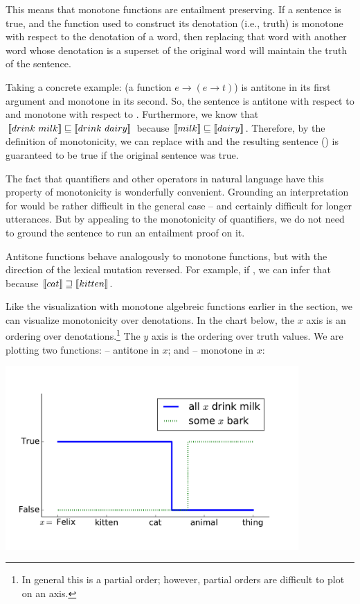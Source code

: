 This means that monotone functions are entailment preserving.
If a sentence is true, and the function used to construct its denotation (i.e., truth)
  is monotone with respect to the denotation of a word, then replacing that word with
  another word whose denotation is a superset of the original word will maintain
  the truth of the sentence.

Taking a concrete example:  (a function $e \rightarrow (e \rightarrow t)$)
  is antitone in its first argument and monotone in its second.
So, the sentence  is antitone with respect to  and
  monotone with respect to .
Furthermore, we know that 
  $\llbracket drink ~ milk\rrbracket \sqsubseteq \llbracket drink~dairy\rrbracket$
  because $\llbracket milk\rrbracket \sqsubseteq \llbracket dairy\rrbracket$.
Therefore, by the definition of monotonicity, we can replace  with
   and the resulting sentence ()
  is guaranteed to be true if the original sentence was true.

The fact that quantifiers and other operators in natural language have this
  property of monotonicity is wonderfully convenient.
Grounding an interpretation for  would be rather
  difficult in the general case -- and certainly difficult for longer utterances.
But by appealing to the monotonicity of quantifiers, we do not need to ground
  the sentence to run an entailment proof on it.

Antitone functions behave analogously to monotone functions, but with the 
  direction of the lexical mutation reversed.
For example, if , we can infer that 
   because 
  $\llbracket cat \rrbracket \sqsupseteq \llbracket kitten\rrbracket$.

Like the visualization with monotone algebreic functions earlier in the section,
  we can visualize monotonicity over denotations.
In the chart below, the $x$ axis is an ordering over denotations.\footnote{
    In general this is a partial order; however, partial orders are difficult
    to plot on an axis.
    }
The $y$ axis is the ordering over truth values.
We are plotting two functions:  -- antitone in $x$; and
   -- monotone in $x$:

\begin{center}
\includegraphics[height=7cm]{img/monotonicity_lex_all.pdf}
\end{center}

